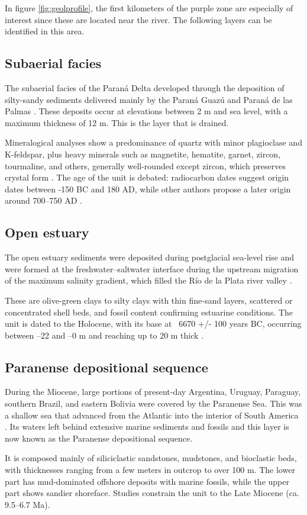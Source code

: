 In figure \ref{fig:geolprofile}, the first kilometers of the purple zone are especially of interest since these are located near the river. The following layers can be identified in this area.

\subsection{Subaerial facies}
The subaerial facies of the Paraná Delta developed through the deposition of silty-sandy sediments delivered mainly by the Paraná Guazú and Paraná de las Palmas \autocite{joseluiscavallottoEvolucionCambiosAmbientales2005}. These deposits occur at elevations between 2 m and sea level, with a maximum thickness of 12 m. This is the layer that is drained.

Mineralogical analyses show a predominance of quartz with minor plagioclase and K-feldspar, plus heavy minerals such as magnetite, hematite, garnet, zircon, tourmaline, and others, generally well-rounded except zircon, which preserves crystal form \autocite{rafaelcordiniContribucionConocimientoGeologia1949}. The age of the unit is debated: radiocarbon dates suggest origin dates between -150 BC and 180 AD, while other authors propose a later origin around 700–750 AD \autocite{joseluiscavallottoEvolucionCambiosAmbientales2005}.

\subsection{Open estuary}
The open estuary sediments were deposited during postglacial sea-level rise and were formed at the freshwater–saltwater interface during the upstream migration of the maximum salinity gradient, which filled the Río de la Plata river valley \autocite{joseluiscavallottoEvolucionCambiosAmbientales2005}.

These are olive-green clays to silty clays with thin fine-sand layers, scattered or concentrated shell beds, and fossil content confirming estuarine conditions. The unit is dated to the Holocene, with its base at ~6670 +/- 100 years BC, occurring between –22 and –0 m and reaching up to 20 m thick \autocite{vogelGroningenRadiocarbonDates1969}.

\subsection{Paranense depositional sequence}
During the Miocene, large portions of present-day Argentina, Uruguay, Paraguay, southern Brazil, and eastern Bolivia were covered by the Paranense Sea. This was a shallow sea that advanced from the Atlantic into the interior of South America . Its waters left behind extensive marine sediments and fossils and this layer is now known as the Paranense depositional sequence.

It is composed mainly of siliciclastic sandstones, mudstones, and bioclastic beds, with thicknesses ranging from a few meters in outcrop to over 100 m. The lower part has mud-dominated offshore deposits with marine fossils, while the upper part shows sandier shoreface. Studies constrain the unit to the Late Miocene (ca. 9.5–6.7 Ma).